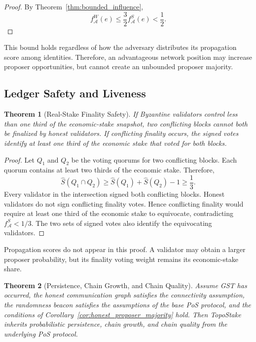 \documentclass[lettersize,journal]{IEEEtran}
\newtheorem{theorem}{Theorem}
\begin{document}
\begin{proof}
By Theorem~\ref{thm:bounded_influence},
\begin{equation}
f_{\mathcal{A}}^{W}(e)
\leq
\frac{3}{2}
f_{\mathcal{A}}^{S}(e)
<
\frac{1}{2}.
\end{equation}
\end{proof}

This bound holds regardless of how the adversary distributes its propagation score among identities.
Therefore, an advantageous network position may increase proposer opportunities, but cannot create an unbounded proposer majority.


\subsection{Ledger Safety and Liveness}

\begin{theorem}[Real-Stake Finality Safety]
\label{thm:finality_safety}
If Byzantine validators control less than one third of the economic-stake snapshot, two conflicting blocks cannot both be finalized by honest validators.
If conflicting finality occurs, the signed votes identify at least one third of the economic stake that voted for both blocks.
\end{theorem}

\begin{proof}
Let $Q_1$ and $Q_2$ be the voting quorums for two conflicting blocks.
Each quorum contains at least two thirds of the economic stake.
Therefore,
\begin{equation}
\hat S(Q_1\cap Q_2)
\geq
\hat S(Q_1)+\hat S(Q_2)-1
\geq
\frac{1}{3}.
\end{equation}
Every validator in the intersection signed both conflicting blocks.
Honest validators do not sign conflicting finality votes.
Hence conflicting finality would require at least one third of the economic stake to equivocate, contradicting
$f_{\mathcal{A}}^{S}<1/3$.
The two sets of signed votes also identify the equivocating validators.
\end{proof}

Propagation scores do not appear in this proof.
A validator may obtain a larger proposer probability, but its finality voting weight remains its economic-stake share.

\begin{theorem}[Persistence, Chain Growth, and Chain Quality]
\label{thm:ledger_liveness}
Assume GST has occurred, the honest communication graph satisfies the connectivity assumption, the randomness beacon satisfies the assumptions of the base PoS protocol, and the conditions of Corollary~\ref{cor:honest_proposer_majority} hold.
Then TopoStake inherits probabilistic persistence, chain growth, and chain quality from the underlying PoS protocol.
\end{theorem}
\end{document}
